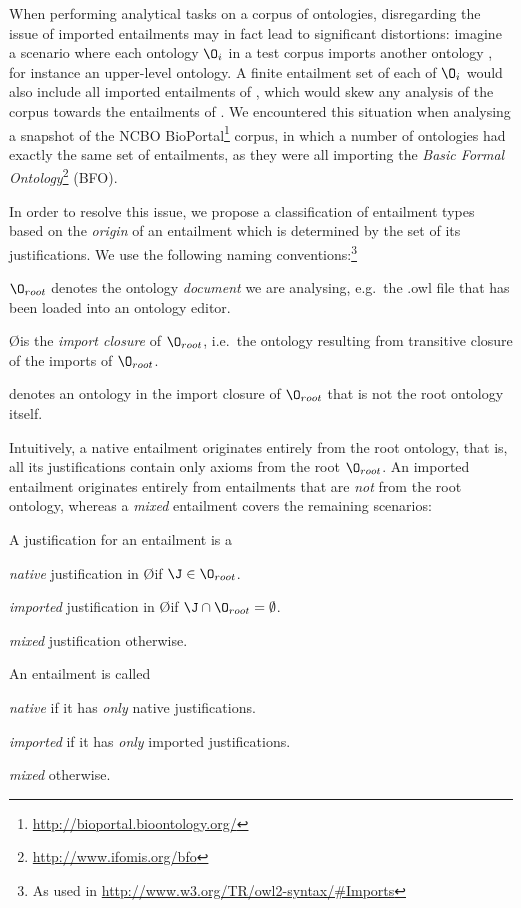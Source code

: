 When performing analytical tasks on a corpus of ontologies, disregarding the issue of imported entailments may in fact lead to significant distortions: imagine a scenario where each ontology $\O_{i}$ in a test corpus imports another ontology \oprime, for instance an upper-level ontology. A finite entailment set of each of $\O_{i}$ would also include all imported entailments of \oprime, which would skew any analysis of the corpus towards the entailments of \oprime. We encountered this situation when analysing a snapshot of the NCBO BioPortal\footnote{\url{http://bioportal.bioontology.org/}} corpus, in which a number of ontologies had exactly the same set of entailments, as they were all importing the \emph{Basic Formal Ontology}\footnote{\url{http://www.ifomis.org/bfo}} (BFO).

In order to resolve this issue, we propose a classification of entailment types based on the \emph{origin} of an entailment which is determined by the set of its justifications. We use the following naming conventions:\footnote{As used in \url{http://www.w3.org/TR/owl2-syntax/\#Imports}}

\begin{compactitem}
\item $\O_{root}$ denotes the ontology \emph{document} we are analysing, e.g.\ the .owl file that has been loaded into an ontology editor.
\item \O is the \emph{import closure} of $\O_{root}$, i.e.\ the ontology resulting from transitive closure of the imports of $\O_{root}$.
\item \oprime denotes an ontology in the import closure of $\O_{root}$ that is not the root ontology itself.
\end{compactitem}

Intuitively, a native entailment originates entirely from the root ontology, that is, all its justifications contain only axioms from the root $\O_{root}$. An imported entailment originates entirely from entailments that are \emph{not} from the root ontology, whereas a \emph{mixed} entailment covers the remaining scenarios:

\begin{defn}
A justification \J for an entailment \ent is a
\begin{compactenum}
\item \emph{native} justification in \O if $\J \in \O_{root}$. 
\item \emph{imported} justification in \O if $\J \cap \O_{root} = \emptyset$. 
\item \emph{mixed} justification otherwise.
\end{compactenum}
An entailment \ent is called 
\begin{compactenum}
\item \emph{native} if it has \emph{only} native justifications.
\item \emph{imported} if it has \emph{only} imported justifications.
\item \emph{mixed} otherwise.
\end{compactenum}
\end{defn}

